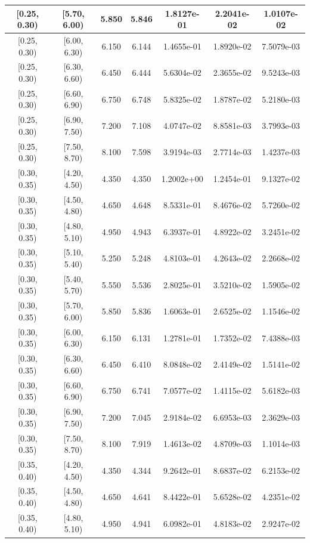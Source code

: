 \begin{longtable}{|c|c|c|c|c|c|c|}
\hline
[0.25, 0.30) & [5.70, 6.00) & 5.850 & 5.846 & 1.8127e-01 & 2.2041e-02 & 1.0107e-02 \\ 
\hline
[0.25, 0.30) & [6.00, 6.30) & 6.150 & 6.144 & 1.4655e-01 & 1.8920e-02 & 7.5079e-03 \\ 
\hline
[0.25, 0.30) & [6.30, 6.60) & 6.450 & 6.444 & 5.6304e-02 & 2.3655e-02 & 9.5243e-03 \\ 
\hline
[0.25, 0.30) & [6.60, 6.90) & 6.750 & 6.748 & 5.8325e-02 & 1.8787e-02 & 5.2180e-03 \\ 
\hline
[0.25, 0.30) & [6.90, 7.50) & 7.200 & 7.108 & 4.0747e-02 & 8.8581e-03 & 3.7993e-03 \\ 
\hline
[0.25, 0.30) & [7.50, 8.70) & 8.100 & 7.598 & 3.9194e-03 & 2.7714e-03 & 1.4237e-03 \\ 
\hline
[0.30, 0.35) & [4.20, 4.50) & 4.350 & 4.350 & 1.2002e+00 & 1.2454e-01 & 9.1327e-02 \\ 
\hline
[0.30, 0.35) & [4.50, 4.80) & 4.650 & 4.648 & 8.5331e-01 & 8.4676e-02 & 5.7260e-02 \\ 
\hline
[0.30, 0.35) & [4.80, 5.10) & 4.950 & 4.943 & 6.3937e-01 & 4.8922e-02 & 3.2451e-02 \\ 
\hline
[0.30, 0.35) & [5.10, 5.40) & 5.250 & 5.248 & 4.8103e-01 & 4.2643e-02 & 2.2668e-02 \\ 
\hline
[0.30, 0.35) & [5.40, 5.70) & 5.550 & 5.536 & 2.8025e-01 & 3.5210e-02 & 1.5905e-02 \\ 
\hline
[0.30, 0.35) & [5.70, 6.00) & 5.850 & 5.836 & 1.6063e-01 & 2.6525e-02 & 1.1546e-02 \\ 
\hline
[0.30, 0.35) & [6.00, 6.30) & 6.150 & 6.131 & 1.2781e-01 & 1.7352e-02 & 7.4388e-03 \\ 
\hline
[0.30, 0.35) & [6.30, 6.60) & 6.450 & 6.410 & 8.0848e-02 & 2.4149e-02 & 1.5141e-02 \\ 
\hline
[0.30, 0.35) & [6.60, 6.90) & 6.750 & 6.741 & 7.0577e-02 & 1.4115e-02 & 5.6182e-03 \\ 
\hline
[0.30, 0.35) & [6.90, 7.50) & 7.200 & 7.045 & 2.9184e-02 & 6.6953e-03 & 2.3629e-03 \\ 
\hline
[0.30, 0.35) & [7.50, 8.70) & 8.100 & 7.919 & 1.4613e-02 & 4.8709e-03 & 1.1014e-03 \\ 
\hline
[0.35, 0.40) & [4.20, 4.50) & 4.350 & 4.344 & 9.2642e-01 & 8.6837e-02 & 6.2153e-02 \\ 
\hline
[0.35, 0.40) & [4.50, 4.80) & 4.650 & 4.641 & 8.4422e-01 & 5.6528e-02 & 4.2351e-02 \\ 
\hline
[0.35, 0.40) & [4.80, 5.10) & 4.950 & 4.941 & 6.0982e-01 & 4.8183e-02 & 2.9247e-02 \\ 

\end{longtable}
